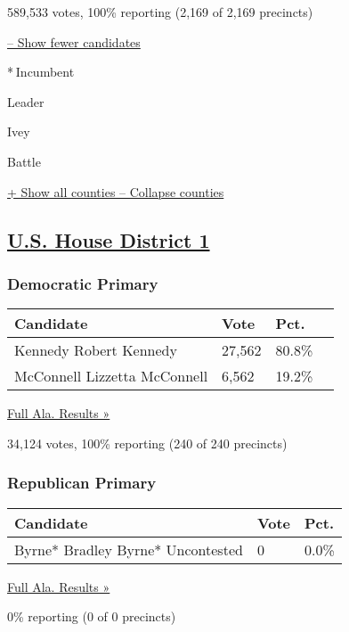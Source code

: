 589,533 votes, 100\% reporting (2,169 of 2,169 precincts)

\protect\hyperlink{}{-- Show fewer candidates}

* Incumbent

Leader

 Ivey

 Battle

\protect\hyperlink{}{+ Show all counties -- Collapse counties}

\hypertarget{us-house-district-1}{%
\subsection{\texorpdfstring{\href{https://www.nytimes3xbfgragh.onion/elections/results/alabama-house-district-1-primary-election}{U.S.
House District 1}}{U.S. House District 1}}\label{us-house-district-1}}

\hypertarget{democratic-primary-1}{%
\subsubsection{Democratic Primary}\label{democratic-primary-1}}

\begin{longtable}[]{@{}llll@{}}
\toprule
Candidate & Vote & Pct. &\tabularnewline
\midrule
\endhead
 Kennedy Robert Kennedy & 27,562 & 80.8\% &\tabularnewline
 McConnell Lizzetta McConnell & 6,562 & 19.2\% &\tabularnewline
\bottomrule
\end{longtable}

\href{https://www.nytimes3xbfgragh.onion/elections/results/alabama}{Full
Ala. Results »}

34,124 votes, 100\% reporting (240 of 240 precincts)

\hypertarget{republican-primary-1}{%
\subsubsection{Republican Primary}\label{republican-primary-1}}

\begin{longtable}[]{@{}lll@{}}
\toprule
Candidate & Vote & Pct.\tabularnewline
\midrule
\endhead
 Byrne* Bradley Byrne* Uncontested & 0 & 0.0\%\tabularnewline
\bottomrule
\end{longtable}

\href{https://www.nytimes3xbfgragh.onion/elections/results/alabama}{Full
Ala. Results »}

0\% reporting (0 of 0 precincts)

